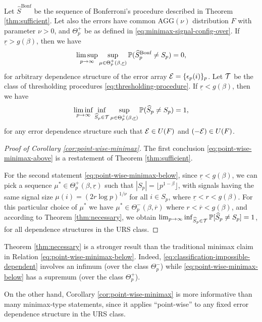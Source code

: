 \begin{corollary}
\label{cor:point-wise-minimax}
Let $\widehat{S}^{\text{Bonf}}$ be the sequence of Bonferroni's procedure described in Theorem \ref{thm:sufficient}. 
Let also the errors have common $\text{AGG}(\nu)$ distribution $F$ with parameter $\nu>0$, and $\Theta_p^+$ be as defined in \eqref{eq:minimax-signal-config-over}.
If $\underline{r}>g(\beta)$, then we have
\begin{equation} \label{eq:point-wise-minimax-above}
    \limsup_{p\to\infty} \sup_{\mu\in\Theta_p^+(\beta, \underline{r})} \P(\widehat{S}^{\text{Bonf}}_p \neq S_p) = 0,
\end{equation}
for arbitrary dependence structure of the error array ${\cal E} = \{\epsilon_p(i)\}_p$.
Let $\cal T$ be the class of thresholding procedures \eqref{eq:thresholding-procedure}. 
If $\underline{r}<g(\beta)$, then we have
\begin{equation} \label{eq:point-wise-minimax-below}
    \liminf_{p\to\infty} \inf_{\widehat{S}_p\in \cal T} \sup_{\mu\in\Theta_p^+(\beta, \underline{r})} \P(\widehat{S}_p \neq S_p) = 1,
\end{equation}
for any error dependence structure such that ${\cal E}\in U(F)$ and ${(-\cal E)}\in U(F)$.
\end{corollary}

\begin{proof}[Proof of Corollary \ref{cor:point-wise-minimax}]
The first conclusion \eqref{eq:point-wise-minimax-above} is a restatement of Theorem \ref{thm:sufficient}.

For the second statement \eqref{eq:point-wise-minimax-below}, since $\underline{r}<g(\beta)$, we can pick a sequence $\mu^*\in\Theta_p^+(\beta, \underline{r})$ such that $|S_p| = \lfloor p^{1-\beta}\rfloor$, with signals having the same signal size $\mu(i)=(2r\log{p})^{1/\nu}$ for all $i\in S_p$, where $\underline{r}<{r}<g(\beta)$.
For this particular choice of $\mu^*$ we have $\mu^*\in\Theta_p^-(\beta, \overline{r})$ where $r<\overline{r}<g(\beta)$,
and according to Theorem \ref{thm:necessary}, we obtain $\lim_{p\to\infty} \inf_{\widehat{S}_p\in \cal T} \mathbb P[\widehat{S}_p \neq S_p] = 1$, for all dependence structures in the URS class.
\end{proof}

\begin{remark}
Theorem \ref{thm:necessary} is a stronger result than the traditional minimax claim in Relation \eqref{eq:point-wise-minimax-below}.
Indeed,  \eqref{eq:classification-impossible-dependent} involves an infimum (over the class $\Theta^-_p$) while \eqref{eq:point-wise-minimax-below} has a supremum (over the class $\Theta^+_p$).

On the other hand, Corollary \ref{cor:point-wise-minimax} is more informative than many minimax-type statements, since it applies ``point-wise'' to any fixed error dependence structure in the URS class.
\end{remark}


